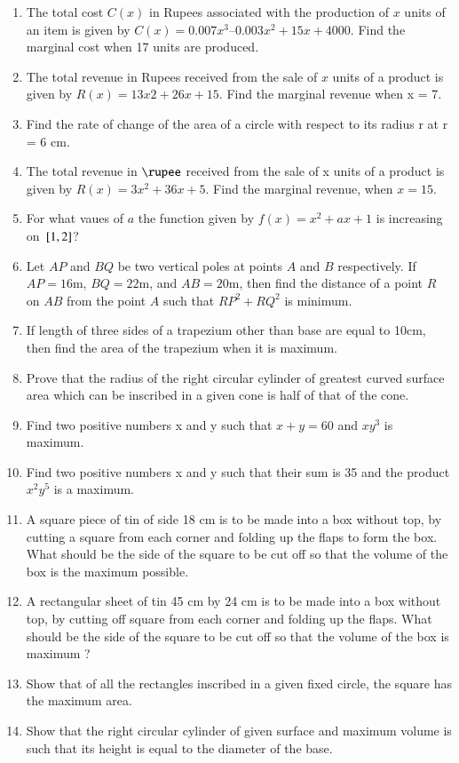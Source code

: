 \begin{enumerate}[label=\arabic*.,ref=\thesubsection.\theenumi]
\item The total cost $C (x)$ in Rupees associated with the production of $x$ units of an item is given by
$C (x) = 0.007x^3 – 0.003x^2 + 15x + 4000$. Find the marginal cost when 17 units are produced.
\item The total revenue in Rupees received from the sale of $x$ units of a product is given by
$R (x) = 13x2 + 26x + 15$.
Find the marginal revenue when x = 7. 
\item Find the rate of change of the area of a circle with respect to its radius r at r = 6 cm.
\item The total revenue in $\rupee$ received from the sale of x units of a product is given by $R(x) = 3x^2+ 36x + 5$. Find the marginal revenue, when $x = 15$.
%
\item For what vaues of $a$ the function given by $f(x) = x^2+ax+1$ is increasing on ${}\left[1,2\right]$?
%
\item Let $AP$ and $BQ$ be two vertical poles at points $A$ and $B$ respectively.  If $AP = 16$m, $BQ = 22$m, and $AB=20$m, then find the distance of a point $R$ on $AB$ from the point $A$ such that $RP^2+RQ^2$ is minimum.
\item  If length of three sides of a trapezium other than base are equal to 10cm, then find the area of the trapezium when it is maximum.
%
\item Prove that the radius of the right circular cylinder of greatest curved surface area which can be inscribed in a given cone is half of that of the cone.
%
\item Find two positive numbers x and y such that $x + y = 60$ and $xy^3$
is maximum.
\item  Find two positive numbers x and y such that their sum is 35 and the product $x^2 y^5$ is a maximum.
\item A square piece of tin of side 18 cm is to be made into a box without top, by cutting a square from each corner and folding up the flaps to form the box. What should be the side of the square to be cut off so that the volume of the box is the maximum possible.
\item  A rectangular sheet of tin 45 cm by 24 cm is to be made into a box without top, by cutting off square from each corner and folding up the flaps. What should be the side of the square to be cut off so that the volume of the box is maximum ?
\item  Show that of all the rectangles inscribed in a given fixed circle, the square has the maximum area.
\item  Show that the right circular cylinder of given surface and maximum volume is such that its height is equal to the diameter of the base.

\end{enumerate}

